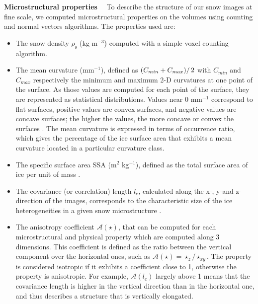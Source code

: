 \documentclass[draft,ms]{agujournal2019}
\begin{document}
\noindent \textbf{Microstructural properties}$\quad$ To describe the structure of our snow images at fine scale, we computed microstructural properties on the volumes using counting and normal vectors algorithms. The properties used are:
\begin{itemize}
    \item The snow density $\rho_{\mathrm{s}}$ (kg m$^{-3}$) computed with a simple voxel counting algorithm.
    
    \item The mean curvature (mm$^{-1}$), defined as $\left(C_{min} + C_{max})\right/2$ with $C_{min}$ and $C_{max}$ respectively the minimum and maximum 2-D curvatures at one point of the surface. As those values are computed for each point of the surface, they are represented as statistical distributions. Values near 0 mm$^{-1}$ correspond to flat surfaces, positive values are convex surfaces, and negative values are concave surfaces; the higher the values, the more concave or convex the surfaces \cite{brzoska2007using, flin_three-dimensional_2004,  wang2012curvature}. The mean curvature is expressed in terms of occurrence ratio, which gives the percentage of the ice surface area that exhibits a mean curvature located in a particular curvature class.
    
    \item The specific surface area SSA (m$^2$ kg$^{-1}$), defined as the total surface area of ice per unit of mass \cite{berryman1998planar, flin2011computations}.
    
    \item  The covariance (or correlation) length $l_{c}$, calculated along the x-, y-and z- direction of the images, corresponds to the characteristic size of the ice heterogeneities in a given snow microstructure \cite{lowe2013general}. 
    
    \item The anisotropy coefficient
    $\mathcal{A}(\star)$, that can be computed for each microstructural and physical property which are computed along 3 dimensions. This coefficient is defined as the ratio between the vertical component over the horizontal ones, such as $\mathcal{A}(\star)=\star_{z} / \star_{x y}$. The property is considered isotropic if it exhibits a coefficient close to 1, otherwise the property is anisotropic. For example, $\mathcal{A}(l_c)$ largely above 1 means that the covariance length is higher in the vertical direction than in the horizontal one, and thus describes a structure that is vertically elongated.
\end{itemize}
\end{document}
